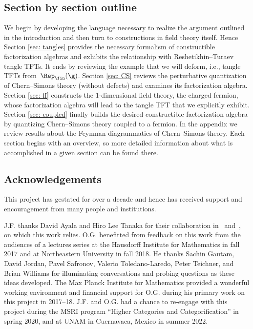 \documentclass[10pt]{amsart}
\begin{document}
\subsection{Section by section outline}

We begin by developing the language necessary to realize the argument outlined in the introduction 
and then turn to constructions in field theory itself.
Hence Section \ref{sec: tangles} provides the necessary formalism of constructible factorization algebras and exhibits the relationship with Reshetikhin--Turaev tangle TFTs.
It ends by reviewing the example that we will deform, i.e., tangle TFTs from~$\Rep_\fin(\g)$.
Section \ref{sec: CS} reviews the perturbative quantization of Chern--Simons theory (without defects) and examines its factorization algebra.
Section \ref{sec: ff} constructs the 1-dimensional field theory, the charged fermion, whose factorization algebra will lead to the tangle TFT that we explicitly exhibit.
Section \ref{sec: coupled} finally builds the desired constructible factorization algebra by quantizing Chern--Simons theory coupled to a fermion.
In the appendix we review results about the Feynman diagrammatics of Chern--Simons theory.
Each section begins with an overview, so more detailed information about what is accomplished in a given section can be found there.

\subsection{Acknowledgements}

This project has gestated for over a decade and hence has received support and encouragement from many people and institutions.

J.F. thanks David Ayala and Hiro Lee Tanaka for their collaboration in~\cite{AFT2} and~\cite{AF.tangle}, on which this work relies.
O.G. benefitted from feedback on this work from the audiences of a lectures series at the Hausdorff Institute for Mathematics in fall 2017 and at Northeastern University in fall 2018.
He thanks Sachin Gautam, David Jordan, Pavel Safronov, Valerio Toledano-Laredo, Peter Teichner, and Brian Williams for illuminating conversations and probing questions as these ideas developed.
The Max Planck Institute for Mathematics provided a wonderful working environment and financial support for O.G. during his primary work on this project in 2017--18.
J.F. and O.G. had a chance to re-engage with this project during the MSRI program ``Higher Categories and Categorification'' in spring 2020, and at UNAM in Cuernavaca, Mexico in summer 2022.
\end{document}
